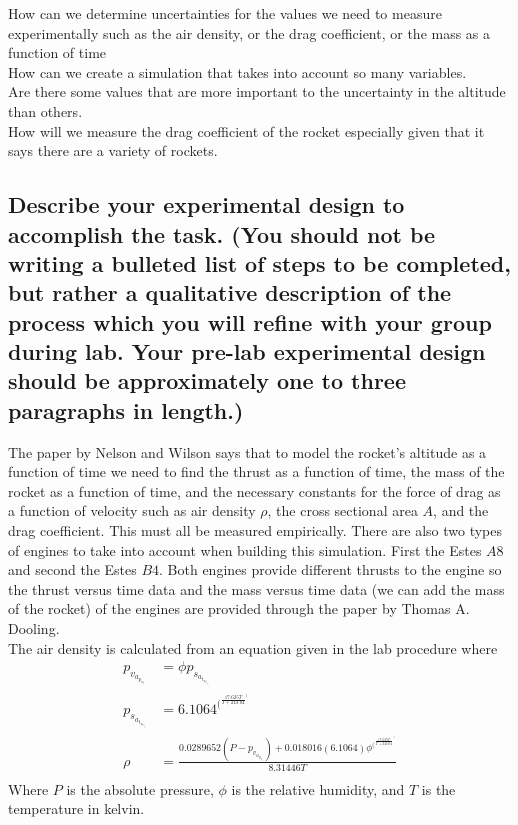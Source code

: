 \documentclass{article}
\begin{document}
   How can we determine uncertainties for the values we need to measure experimentally such as the air density, or the drag coefficient, or the mass as a function of time\\

   How can we create a simulation that takes into account so many variables.\\

   Are there some values that are more important to the uncertainty in the altitude than others.\\

   How will we measure the drag coefficient of the rocket especially given that it says there are a variety of rockets.\\

\subsection*{Describe your experimental design to accomplish the task. (You should not be writing a bulleted list of steps to be completed, but rather a qualitative description of the process which you will refine with your group during lab. Your pre-lab experimental design should be approximately one to three paragraphs in length.)}

    The paper by Nelson and Wilson says that to model the rocket's altitude as a function of time we need to find the thrust as a function of time, the mass of the rocket as a function of time, and the necessary constants for the force of drag as a function of velocity such as air density $\rho$, the cross sectional area $A$, and the drag coefficient. This must all be measured empirically. There are also two types of engines to take into account when building this simulation. First the Estes $A8$ and second the Estes $B4$. Both engines provide different thrusts to the engine so the thrust versus time data and the mass versus time data (we can add the mass of the rocket) of the engines are provided through the paper by Thomas A. Dooling. \\ 

    The air density is calculated from an equation given in the lab procedure where 
    \begin{align*}
        p_v_a_p_o_r &= \phi p_s_a_t_u_r_a_t_e_d\\
        p_s_a_t_u_r_a_t_e_d &= 6.1064^(^\frac{17.625T}{T + 243.04}^)\\
        \rho &= \frac{0.0289652(P- p_v_a_p_o_r)+ 0.018016(6.1064)\phi^(^\frac{17.625T}{T + 243.04}^)}{8.31446T}\\
    \end{align*}
    Where $P$ is the absolute pressure, $\phi$ is the relative humidity, and $T$ is the temperature in kelvin.\\
\end{document}
